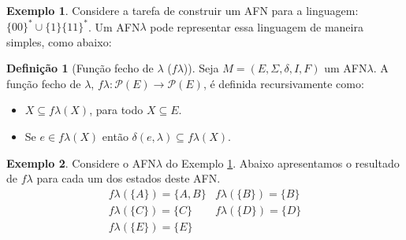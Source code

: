 \documentclass[a4paper]{article}
\theoremstyle{definition}
\newtheorem{Example}{Exemplo}
\newtheorem{Definition}{Definição}
\begin{document}
  \begin{Example}\label{afnlambdaex}
    Considere a tarefa de construir um AFN para a linguagem: $\{00\}^*
    \cup\{1\}\{11\}^*$. Um AFN$\lambda$ pode representar essa linguagem de
    maneira simples, como abaixo:
    \begin{figure}[H]
      \centering
    \end{figure}
  \end{Example}

  \begin{Definition}[Função fecho de $\lambda$ ($f\lambda$)]
    Seja $M=(E,\Sigma,\delta,I,F)$ um AFN$\lambda$. A função fecho de $\lambda$,
    $f\lambda : \mathcal{P}(E)\to\mathcal{P}(E)$, é definida recursivamente
    como:
    \begin{itemize}
       \item $X \subseteq f\lambda(X)$, para todo $X \subseteq E$.
       \item Se $e\in f\lambda(X)$ então $\delta(e,\lambda)\subseteq f\lambda(X)$.
    \end{itemize}
  \end{Definition}

  \begin{Example}
    Considere o AFN$\lambda$ do Exemplo \ref{afnlambdaex}. Abaixo apresentamos o
    resultado de $f\lambda$ para cada um dos estados deste AFN.
    \[
      \begin{array}{ll}
        f\lambda(\{A\}) = \{A,B\} & f\lambda(\{B\}) = \{B\}\\
        f\lambda(\{C\}) = \{C\}   & f\lambda(\{D\}) = \{D\} \\
        f\lambda(\{E\}) = \{E\}
      \end{array}
    \]
  \end{Example}
\end{document}
